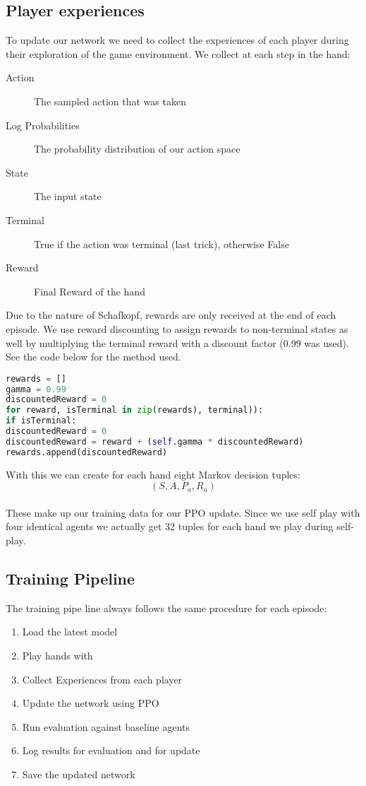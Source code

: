 \subsection{Player experiences}
To update our network we need to collect the experiences of each player during their exploration of the game
environment.
We collect at each step in the hand:
\begin{description}
\item[Action] The sampled action that was taken
\item[Log Probabilities] The probability distribution of our action space
\item[State] The input state
\item[Terminal] True if the action was terminal (last trick), otherwise False
\item[Reward] Final Reward of the hand
\end{description}
Due to the nature of Schafkopf, rewards are only received at the end of each episode.
We use reward discounting to assign rewards to non-terminal states as well by multiplying the terminal reward with a
discount factor (0.99 was used). See the code below for the method used.
\begin{lstlisting}[language=Python,label={lst:rewards},caption={Reward calculation for non-terminal steps}]
rewards = []
gamma = 0.99
discountedReward = 0
for reward, isTerminal in zip(rewards), terminal)):
if isTerminal:
discountedReward = 0
discountedReward = reward + (self.gamma * discountedReward)
rewards.append(discountedReward)
\end{lstlisting}
With this we can create for each hand eight Markov decision tuples: \[(S,A,P_{a},R_{a})\]\\
These make up our training data for our PPO update.
Since we use self play with four identical agents we actually get 32 tuples for each hand we play during self-play.

\subsection{Training Pipeline}
The training pipe line always follows the same procedure for each episode:
\begin{enumerate}
\item Load the latest model
\item Play hands with
\item Collect Experiences from each player
\item Update the network using PPO
\item Run evaluation against baseline agents
\item Log results for evaluation and for update
\item Save the updated network
\end{enumerate}




